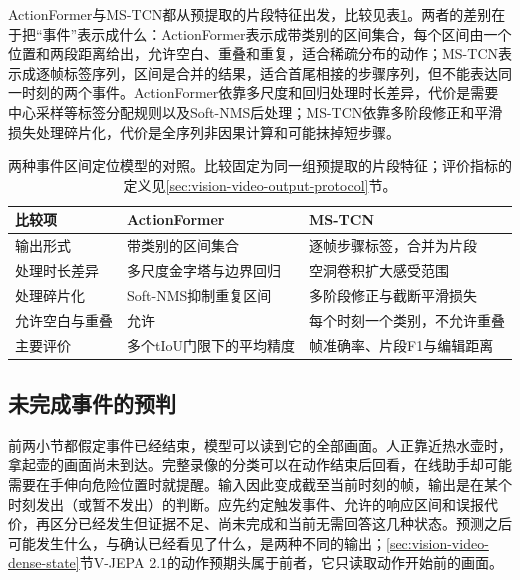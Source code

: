 ActionFormer与MS-TCN都从预提取的片段特征出发，比较见表\ref{tab:vision-video-event-compare}。两者的差别在于把“事件”表示成什么：ActionFormer表示成带类别的区间集合，每个区间由一个位置和两段距离给出，允许空白、重叠和重复，适合稀疏分布的动作；MS-TCN表示成逐帧标签序列，区间是合并的结果，适合首尾相接的步骤序列，但不能表达同一时刻的两个事件。ActionFormer依靠多尺度和回归处理时长差异，代价是需要中心采样等标签分配规则以及Soft-NMS后处理；MS-TCN依靠多阶段修正和平滑损失处理碎片化，代价是全序列非因果计算和可能抹掉短步骤。

\begin{table}[htbp]
  \centering
  \small
  \begin{tabularx}{\linewidth}{@{}lXX@{}}
    \toprule
    比较项 & ActionFormer & MS-TCN\\
    \midrule
    输出形式 & 带类别的区间集合 & 逐帧步骤标签，合并为片段\\
    处理时长差异 & 多尺度金字塔与边界回归 & 空洞卷积扩大感受范围\\
    处理碎片化 & Soft-NMS抑制重复区间 & 多阶段修正与截断平滑损失\\
    允许空白与重叠 & 允许 & 每个时刻一个类别，不允许重叠\\
    主要评价 & 多个tIoU门限下的平均精度 & 帧准确率、片段F1与编辑距离\\
    \bottomrule
  \end{tabularx}
  \caption{两种事件区间定位模型的对照。比较固定为同一组预提取的片段特征；评价指标的定义见\ref{sec:vision-video-output-protocol}节。}
  \label{tab:vision-video-event-compare}
\end{table}

\subsection{未完成事件的预判}
\label{sec:vision-video-proactive-response}

前两小节都假定事件已经结束，模型可以读到它的全部画面。人正靠近热水壶时，拿起壶的画面尚未到达。完整录像的分类可以在动作结束后回看，在线助手却可能需要在手伸向危险位置时就提醒。输入因此变成截至当前时刻的帧，输出是在某个时刻发出（或暂不发出）的判断。应先约定触发事件、允许的响应区间和误报代价，再区分已经发生但证据不足、尚未完成和当前无需回答这几种状态。预测之后可能发生什么，与确认已经看见了什么，是两种不同的输出；\ref{sec:vision-video-dense-state}节V-JEPA 2.1的动作预期头属于前者，它只读取动作开始前的画面。

